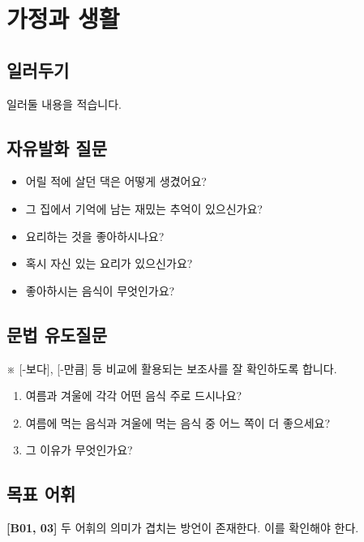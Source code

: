 \section{가정과 생활}
\subsection{일러두기}
일러둘 내용을 적습니다.

\subsection{자유발화 질문}
\begin{itemize}[noitemsep]
  \item 어릴 적에 살던 댁은 어떻게 생겼어요?
  \item 그 집에서 기억에 남는 재밌는 추억이 있으신가요?
  \item 요리하는 것을 좋아하시나요?
  \item 혹시 자신 있는 요리가 있으신가요?
  \item 좋아하시는 음식이 무엇인가요?
\end{itemize}

\subsection{문법 유도질문}
※ [-보다], [-만큼] 등 비교에 활용되는 보조사를 잘 확인하도록 합니다.

\begin{enumerate}[noitemsep]
  \item 여름과 겨울에 각각 어떤 음식 주로 드시나요?
  \item 여름에 먹는 음식과 겨울에 먹는 음식 중 어느 쪽이 더 좋으세요?
  \item 그 이유가 무엇인가요?
\end{enumerate}

\subsection{목표 어휘}
%

\textbf{[B01, 03]} 두 어휘의 의미가 겹치는 방언이 존재한다. 이를 확인해야 한다. \\

